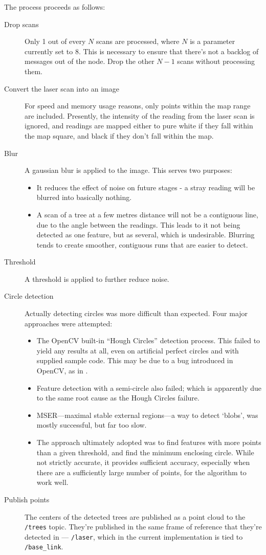 \documentclass[12pt,oneside,a4paper]{book}
\begin{document}
The process proceeds as follows:
\begin{description}
\item[Drop scans] Only 1 out of every $N$ scans are processed, where
  $N$ is a parameter currently set to  8. This is
  necessary to ensure that there's not a backlog of messages out of
  the node. Drop the other $N-1$ scans without processing them.
\item[Convert the laser scan into an image] For speed and memory usage
  reasons, only points within the map range are included. Presently,
  the intensity of the reading from the laser scan is ignored, and
  readings are mapped either to pure white if they fall within the map
  square, and black if they don't fall within the map.
\item[Blur] A gaussian blur is applied to the image. This serves two
  purposes:
  \begin{itemize}
  \item It reduces the effect of noise on future stages - a stray
    reading will be blurred into basically nothing.
  \item A scan of a tree at a few metres distance will not be a
    contiguous line, due to the angle between the readings. This leads
    to it not being detected as one feature, but as several, which is
    undesirable. Blurring tends to create smoother, contiguous runs
    that are easier to detect.
  \end{itemize}
\item[Threshold] A threshold is applied to further reduce noise.
\item[Circle detection] Actually detecting circles was more difficult
  than expected. Four major approaches were attempted:
  \begin{itemize}
  \item The OpenCV built-in ``Hough Circles'' detection process. This
    failed to yield any results at all, even on artificial perfect
    circles and with supplied sample code. This may be due to a bug
    introduced in OpenCV, as in .
  \item Feature detection with a semi-circle also failed; which is
    apparently due to the same root cause as the Hough Circles
    failure.
  \item MSER---maximal stable external regions---a way to detect
    `blobs', was mostly successful, but far too slow.
  \item The approach ultimately adopted was to find features with more
    points than a given threshold, and find the minimum enclosing
    circle. While not strictly accurate, it provides sufficient
    accuracy, especially when there are a sufficiently large number of
    points, for the algorithm to work well.
  \end{itemize}
\item[Publish points] The centers of the detected trees are published
  as a point cloud to the \texttt{/trees} topic. They're published in
  the same frame of reference that they're detected in ---
  \texttt{/laser}, which in the current implementation is tied to
  \texttt{/base\_link}.
\end{description}
\end{document}
